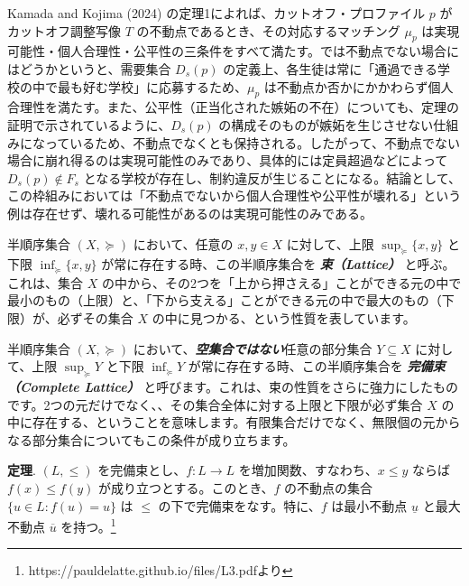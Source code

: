 \documentclass[12pt, a4paper]{article}
\theoremstyle{definition}
\theoremstyle{remark}
\theoremstyle{plain}
\begin{document}
Kamada and Kojima (2024) の定理1によれば、カットオフ・プロファイル $p$ がカットオフ調整写像 $T$ の不動点であるとき、その対応するマッチング $\mu_p$ は実現可能性・個人合理性・公平性の三条件をすべて満たす。では不動点でない場合にはどうかというと、需要集合 $D_s(p)$ の定義上、各生徒は常に「通過できる学校の中で最も好む学校」に応募するため、$\mu_p$ は不動点か否かにかかわらず個人合理性を満たす。また、公平性（正当化された嫉妬の不在）についても、定理の証明で示されているように、$D_s(p)$ の構成そのものが嫉妬を生じさせない仕組みになっているため、不動点でなくとも保持される。したがって、不動点でない場合に崩れ得るのは実現可能性のみであり、具体的には定員超過などによって $D_s(p)\notin F_s$ となる学校が存在し、制約違反が生じることになる。結論として、この枠組みにおいては「不動点でないから個人合理性や公平性が壊れる」という例は存在せず、壊れる可能性があるのは実現可能性のみである。



\bigbreak







半順序集合 $(X, \succeq)$ において、任意の $x, y \in X$ に対して、上限 $\sup_{\succeq} \{x, y\}$ と下限 $\inf_{\succeq} \{x, y\}$ が常に存在する時、この半順序集合を \textbf{\textit{束（Lattice）}} と呼ぶ。これは、集合 $X$ の中から、その2つを「上から押さえる」ことができる元の中で最小のもの（上限）と、「下から支える」ことができる元の中で最大のもの（下限）が、必ずその集合 $X$ の中に見つかる、という性質を表しています。


半順序集合 $(X, \succeq)$ において、\textbf{\textit{空集合ではない}}任意の部分集合 $Y \subseteq X$ に対して、上限 $\sup_{\succeq} Y$ と下限 $\inf_{\succeq} Y$ が常に存在する時、この半順序集合を \textbf{\textit{完備束（Complete Lattice）}} と呼びます。これは、束の性質をさらに強力にしたものです。2つの元だけでなく、、その集合全体に対する上限と下限が必ず集合 $X$ の中に存在する、ということを意味します。有限集合だけでなく、無限個の元からなる部分集合についてもこの条件が成り立ちます。


\textbf{定理}. $(L, \leq)$ を完備束とし、$f: L \to L$ を増加関数、すなわち、$x \leq y$ ならば $f(x) \leq f(y)$ が成り立つとする。このとき、$f$ の不動点の集合 $\{ u \in L : f(u) = u \}$ は $\leq$ の下で完備束をなす。特に、$f$ は最小不動点 $\underline{u}$ と最大不動点 $\overline{u}$ を持つ。\footnote{https://pauldelatte.github.io/files/L3.pdfより}
\end{document}
